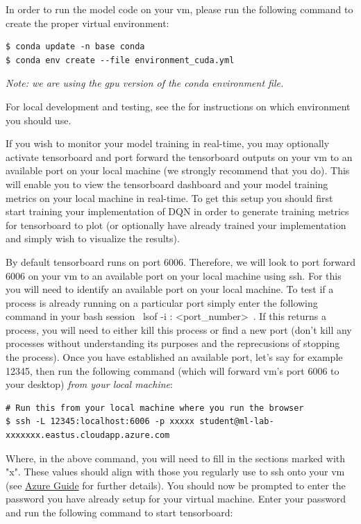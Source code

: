 In order to run the model code on your vm, please run the following command to create the proper virtual environment:

\begin{lstlisting}
$ conda update -n base conda
$ conda env create --file environment_cuda.yml
\end{lstlisting}

\textit{Note: we are using the gpu version of the conda environment file.}

For local development and testing, see the  for instructions on which environment you should use.

If you wish to monitor your model training in real-time, you may optionally activate tensorboard and port forward the tensorboard outputs on your vm to an available port on your local machine (we strongly recommend that you do). This will enable you to view the tensorboard dashboard and your model training metrics on your local machine in real-time. To get this setup you should first start training your implementation of DQN in order to generate training metrics for tensorboard to plot (or optionally have already trained your implementation and simply wish to visualize the results).

By default tensorboard runs on port 6006. Therefore, we will look to port forward 6006 on your vm to an available port on your local machine using ssh. For this you will need to identify an available port on your local machine. To test if a process is already running on a particular port simply enter the following command in your bash session ~lsof -i : <port_number>~. If this returns a process, you will need to either kill this process or find a new port (don't kill any processes without understanding its purposes and the reprecusions of stopping the process). Once you have established an available port, let's say for example 12345, then run the following command (which will forward vm's port 6006 to your desktop) \textit{from your local machine}:

\begin{lstlisting}
# Run this from your local machine where you run the browser
$ ssh -L 12345:localhost:6006 -p xxxxx student@ml-lab-xxxxxxx.eastus.cloudapp.azure.com
\end{lstlisting}

Where, in the above command, you will need to fill in the sections marked with "x". These values should align with those you regularly use to ssh onto your vm (see \href{https://github.com/scpd-proed/XCS234-Handouts/blob/main/Azure/Azure%20Guide.pdf}{Azure Guide} for further details). You should now be prompted to enter the password you have already setup for your virtual machine. Enter your password and run the following command to start tensorboard:

